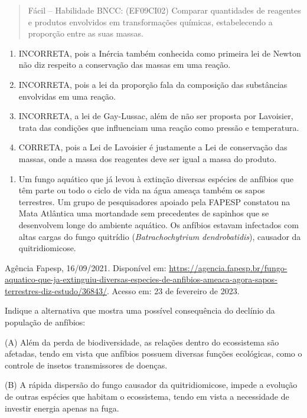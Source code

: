 \begin{quote}
Fácil -- Habilidade BNCC: (EF09CI02) Comparar quantidades de reagentes e
produtos envolvidos em transformações químicas, estabelecendo a
proporção entre as suas massas.
\end{quote}

\begin{enumerate}
\def\labelenumi{(\Alph{enumi})}
\item
  INCORRETA, pois a Inércia também conhecida como primeira lei de Newton
  não diz respeito a conservação das massas em uma reação.
\item
  INCORRETA, pois a lei da proporção fala da composição das substâncias
  envolvidas em uma reação.
\item
  INCORRETA, a lei de Gay-Lussac, além de não ser proposta por
  Lavoisier, trata das condições que influenciam uma reação como pressão
  e temperatura.
\item
  CORRETA, pois a Lei de Lavoisier é justamente a Lei de conservação das
  massas, onde a massa dos reagentes deve ser igual a massa do produto.
\end{enumerate}

\begin{enumerate}
\def\labelenumi{\arabic{enumi})}
\item
  Um fungo aquático que já levou à extinção diversas espécies de
  anfíbios que têm parte ou todo o ciclo de vida na água ameaça também
  os sapos terrestres. Um grupo de pesquisadores apoiado pela FAPESP
  constatou na Mata Atlântica uma mortandade sem precedentes de sapinhos
  que se desenvolvem longe do ambiente aquático. Os anfíbios estavam
  infectados com altas cargas do fungo quitrídio (\emph{Batrachochytrium
  dendrobatidis}), causador da quitridiomicose.
\end{enumerate}

Agência Fapesp, 16/09/2021. Disponível em:
\url{https://agencia.fapesp.br/fungo-aquatico-que-ja-extinguiu-diversas-especies-de-anfibios-ameaca-agora-sapos-terrestres-diz-estudo/36843/}.
Acesso em: 23 de fevereiro de 2023.

Indique a alternativa que mostra uma possível consequência do declínio
da população de anfíbios:

(A) Além da perda de biodiversidade, as relações dentro do ecossistema
são afetadas, tendo em vista que anfíbios possuem diversas funções
ecológicas, como o controle de insetos transmissores de doenças.

(B) A rápida dispersão do fungo causador da quitridiomicose, impede a
evolução de outras espécies que habitam o ecossistema, tendo em vista a
necessidade de investir energia apenas na fuga.


